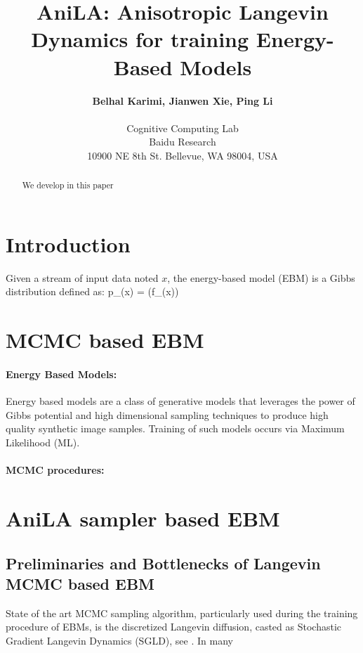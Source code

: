 \documentclass{article}
\begin{document}
\title{AniLA: Anisotropic Langevin Dynamics for training Energy-Based Models}

 \author{\textbf{Belhal Karimi, Jianwen Xie, Ping Li} \\\\
 Cognitive Computing Lab\\
 Baidu Research\\
   10900 NE 8th St. Bellevue, WA 98004, USA
 }

\date{}
\maketitle

\begin{abstract}
We develop in this paper
\end{abstract}

\section{Introduction}

Given a stream of input data noted $x$, the energy-based model (EBM) is a Gibbs distribution defined as:
\beq\label{eq:ebm}
p_{\theta}(x) =  (f_{\theta}(x))
\eeq


\section{MCMC based EBM}

\paragraph{Energy Based Models: }
Energy based models \cite{lecun2006tutorial,ngiam2011learning} are a class of generative models that leverages the power of Gibbs potential and high dimensional sampling techniques to produce high quality synthetic image samples.
Training of such models occurs via Maximum Likelihood (ML).

\paragraph{MCMC procedures: }



\section{AniLA sampler based EBM}

\subsection{Preliminaries and Bottlenecks of Langevin MCMC based EBM}
State of the art MCMC sampling algorithm, particularly used during the training procedure of EBMs, is the discretized Langevin diffusion, casted as Stochastic Gradient Langevin Dynamics (SGLD), see \cite{welling2011bayesian}.
In many 
\end{document}
